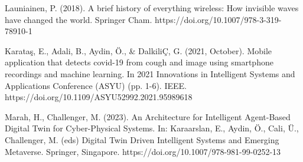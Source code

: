 \documentclass[a4paper]{article}
\begin{document}
\begin{multicols}{2}
\begin{thebibliography}{8}
 Launiainen, P. (2018). A brief history of everything wireless: How invisible waves have changed the world. Springer Cham. https://doi.org/10.1007/978-3-319-78910-1

 Karataş, E., Adali, B., Aydin, Ö., \& DalkiliÇ, G. (2021, October). Mobile application that detects covid-19 from cough and image using smartphone recordings and machine learning. In 2021 Innovations in Intelligent Systems and Applications Conference (ASYU) (pp. 1-6). IEEE. https://doi.org/10.1109/ASYU52992.2021.95989618

 Marah, H., Challenger, M. (2023). An Architecture for Intelligent Agent-Based Digital Twin for Cyber-Physical Systems. In: Karaarslan, E., Aydin, Ö., Cali, Ü., Challenger, M. (eds) Digital Twin Driven Intelligent Systems and Emerging Metaverse. Springer, Singapore. https://doi.org/10.1007/978-981-99-0252-13

\end{thebibliography}

\end{multicols}
\end{document}
